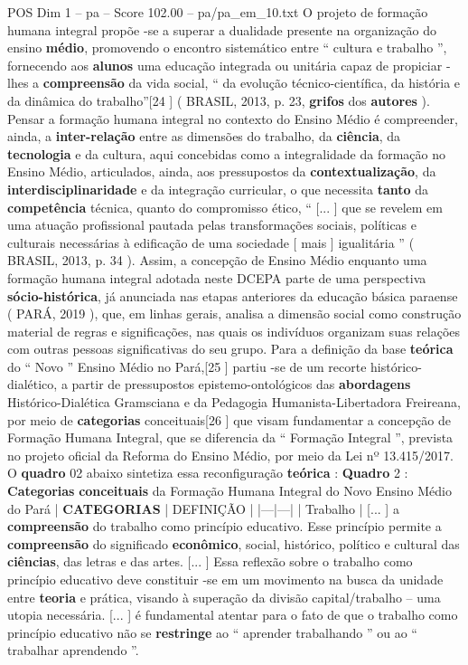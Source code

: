 \begin{textsample}{POS Dim 1 – pa – Score 102.00 – pa/pa\_em\_10.txt}
O projeto de formação humana integral propõe -se a superar a dualidade presente na organização do ensino \textbf{médio}, promovendo o encontro sistemático entre “ cultura e trabalho ”, fornecendo aos \textbf{alunos} uma educação integrada ou unitária capaz de propiciar -lhes a \textbf{compreensão} da vida social, “ da evolução técnico-científica, da história e da dinâmica do trabalho”[24 ] ( BRASIL, 2013, p. 23, \textbf{grifos} dos \textbf{autores} ).
Pensar a formação humana integral no contexto do Ensino Médio é compreender, ainda, a \textbf{inter-relação} entre as dimensões do trabalho, da \textbf{ciência}, da \textbf{tecnologia} e da cultura, aqui concebidas como a integralidade da formação no Ensino Médio, articulados, ainda, aos pressupostos da \textbf{contextualização}, da \textbf{interdisciplinaridade} e da integração curricular, o que necessita \textbf{tanto} da \textbf{competência} técnica, quanto do compromisso ético, “ [... ] que se revelem em uma atuação profissional pautada pelas transformações sociais, políticas e culturais necessárias à edificação de uma sociedade [ mais ] igualitária ” ( BRASIL, 2013, p. 34 ).
Assim, a concepção de Ensino Médio enquanto uma formação humana integral adotada neste DCEPA parte de uma perspectiva \textbf{sócio-histórica}, já anunciada nas etapas anteriores da educação básica paraense ( PARÁ, 2019 ), que, em linhas gerais, analisa a dimensão social como construção material de regras e significações, nas quais os indivíduos organizam suas relações com outras pessoas significativas do seu grupo.
Para a definição da base \textbf{teórica} do “ Novo ” Ensino Médio no Pará,[25 ] partiu -se de um recorte histórico-dialético, a partir de pressupostos epistemo-ontológicos das \textbf{abordagens} Histórico-Dialética Gramsciana e da Pedagogia Humanista-Libertadora Freireana, por meio de \textbf{categorias} conceituais[26 ] que visam fundamentar a concepção de Formação Humana Integral, que se diferencia da “ Formação Integral ”, prevista no projeto oficial da Reforma do Ensino Médio, por meio da Lei nº 13.415/2017.
O \textbf{quadro} 02 abaixo sintetiza essa reconfiguração \textbf{teórica} : \textbf{Quadro} 2 : \textbf{Categorias} \textbf{conceituais} da Formação Humana Integral do Novo Ensino Médio do Pará | \textbf{CATEGORIAS} | DEFINIÇÃO | |---|---| | Trabalho | [... ] a \textbf{compreensão} do trabalho como princípio educativo.
Esse princípio permite a \textbf{compreensão} do significado \textbf{econômico}, social, histórico, político e cultural das \textbf{ciências}, das letras e das artes. [... ] Essa reflexão sobre o trabalho como princípio educativo deve constituir -se em um movimento na busca da unidade entre \textbf{teoria} e prática, visando à superação da divisão capital/trabalho – uma utopia necessária. [... ] é fundamental atentar para o fato de que o trabalho como princípio educativo não se \textbf{restringe} ao “ aprender trabalhando ” ou ao “ trabalhar aprendendo ”.

\end{textsample}
